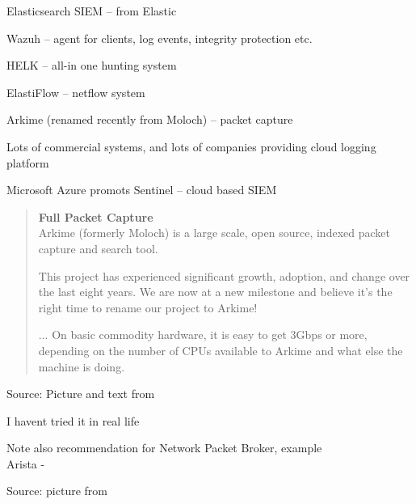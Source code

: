 \documentclass[Screen16to9,17pt]{foils}
\begin{document}
\begin{list2}
\item Elasticsearch SIEM -- from Elastic
\item Wazuh -- agent for clients, log events, integrity protection etc.
\item HELK -- all-in one hunting system
\item ElastiFlow -- netflow system
\item Arkime (renamed recently from Moloch) -- packet capture
\end{list2}

Lots of commercial systems, and lots of companies providing cloud logging platform

Microsoft Azure promots Sentinel -- cloud based SIEM\\ {\footnotesize
{}}



\begin{quote}\small
{\bf Full Packet Capture}\\
Arkime (formerly Moloch) is a large scale, open source, indexed packet capture and search tool.

This project has experienced significant growth, adoption, and change over the last eight years. We are now at a new milestone and believe it’s the right time to rename our project to Arkime!

...
On basic commodity hardware, it is easy to get 3Gbps or more, depending on the number of CPUs available to Arkime and what else the machine is doing.
\end{quote}
Source: Picture and text from 

\begin{list2}
\item I havent tried it in real life
\item Note also recommendation for Network Packet Broker, example\\
Arista - 
\end{list2}





Source: picture from 
\end{document}
